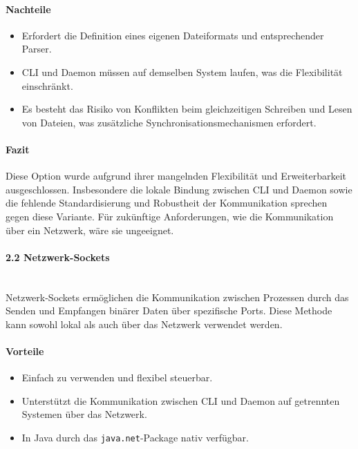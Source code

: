 \documentclass[a4paper,12pt]{report}
\begin{document}
    \paragraph{Nachteile}
    \begin{itemize}
        \item Erfordert die Definition eines eigenen Dateiformats und entsprechender Parser.
        \item CLI und Daemon müssen auf demselben System laufen, was die Flexibilität einschränkt.
        \item Es besteht das Risiko von Konflikten beim gleichzeitigen Schreiben und Lesen von Dateien, was zusätzliche Synchronisationsmechanismen erfordert.
    \end{itemize}

    \paragraph{Fazit}
    Diese Option wurde aufgrund ihrer mangelnden Flexibilität und Erweiterbarkeit ausgeschlossen.
    Insbesondere die lokale Bindung zwischen CLI und Daemon sowie die fehlende Standardisierung und Robustheit der Kommunikation sprechen gegen diese Variante.
    Für zukünftige Anforderungen, wie die Kommunikation über ein Netzwerk, wäre sie ungeeignet.

    \paragraph{2.2 Netzwerk-Sockets}\mbox{}\\
    Netzwerk-Sockets ermöglichen die Kommunikation zwischen Prozessen durch das Senden und Empfangen binärer Daten über spezifische Ports.
    Diese Methode kann sowohl lokal als auch über das Netzwerk verwendet werden.

    \paragraph{Vorteile}
    \begin{itemize}
        \item Einfach zu verwenden und flexibel steuerbar.
        \item Unterstützt die Kommunikation zwischen CLI und Daemon auf getrennten Systemen über das Netzwerk.
        \item In Java durch das \texttt{java.net}-Package nativ verfügbar.
    \end{itemize}
\end{document}
